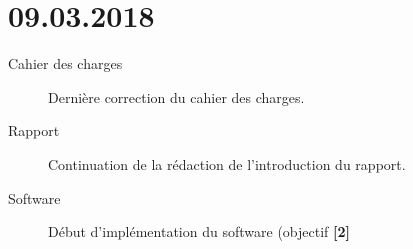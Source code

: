 \section*{09.03.2018}

\begin{description}
	\item [Cahier des charges] Dernière correction du cahier des charges.
	\item [Rapport] Continuation de la rédaction de l'introduction du rapport.
	\item [Software] Début d'implémentation du software (objectif \textbf{[2]}
\end{description}